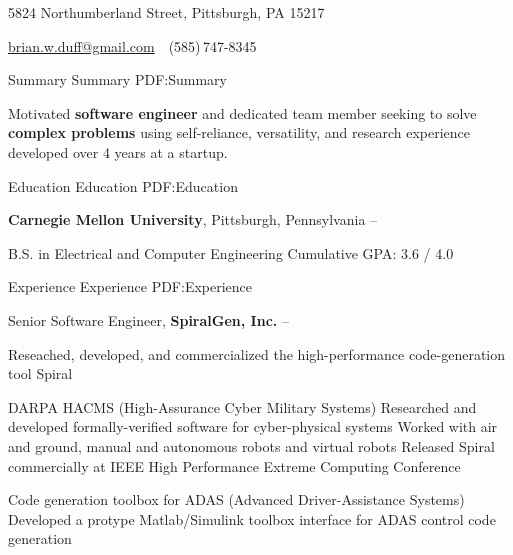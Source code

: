 \documentclass[letterpaper,MMMyyyy,nonstopmode]{simpleresumecv}
\newcommand{\CVAuthor}{Brian W. Duff}
\begin{document}

\Title{\CVAuthor}

\begin{SubTitle}
5824 Northumberland Street, Pittsburgh, PA 15217
\par
\href{mailto:brian.w.duff@gmail.com}
{brian.w.duff@gmail.com}
\,\SubBulletSymbol\,
(585)\,747-8345
\end{SubTitle}

\begin{Body}


\Section
{Summary}
{Summary}
{PDF:Summary}

\Entry
Motivated \textbf{software engineer} and dedicated team member seeking to solve \textbf{complex problems} using self-reliance, versatility, and research experience developed over 4 years at a startup. 



\Section
{Education}
{Education}
{PDF:Education}

\Entry
\textbf{Carnegie Mellon University},
Pittsburgh, Pennsylvania
\hfill
{} --


\Gap
\BulletItem
B.S. in
Electrical and Computer Engineering
\SubBulletItem
Cumulative GPA: 3.6 / 4.0




\Section
{Experience}
{Experience}
{PDF:Experience}

\Entry
Senior Software Engineer,
\textbf{SpiralGen, Inc.}
\hfill
{} --

\BigGap
Reseached, developed, and commercialized the high-performance code-generation tool Spiral

\BigGap

\BulletItem
DARPA HACMS (High-Assurance Cyber Military Systems)
\SubBulletItem
Researched and developed formally-verified software for cyber-physical systems
\SubBulletItem
Worked with air and ground, manual and autonomous robots and virtual robots
\SubBulletItem
Released Spiral commercially at IEEE High Performance Extreme Computing Conference
\Gap

\BulletItem
Code generation toolbox for ADAS (Advanced Driver-Assistance Systems)
\SubBulletItem
Developed a protype Matlab/Simulink toolbox interface for ADAS control code generation
\Gap


\end{Body}
\end{document}

